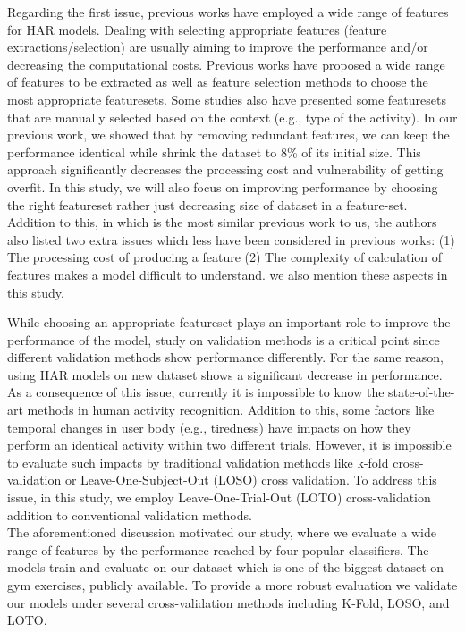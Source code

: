 \documentclass[journal,article,submit,moreauthors,pdftex]{Definitions/mdpi}
\begin{document}
%
Regarding the first issue, previous works have employed a wide range of features for HAR models. Dealing with selecting appropriate features (feature extractions/selection) are usually aiming to improve the performance and/or decreasing the computational costs. Previous works have proposed a wide range of features to be extracted as well as feature selection methods to choose the most appropriate featuresets. Some studies also have presented some featuresets that are manually selected based on the context (e.g., type of the activity). In our previous work\cite{Nourani_CoMoRea2019}, we showed that by removing redundant features, we can keep the performance identical while shrink the dataset to 8\% of its initial size. This approach significantly decreases the processing cost and vulnerability of getting overfit. In this study, we will also focus on improving performance by choosing the right featureset rather just decreasing size of dataset in a feature-set.\\
Addition to this, in \cite{rosati2018comparison} which is the most similar previous work to us, the authors also listed two extra issues which less have been considered in previous works:
(1) The processing cost of producing a feature
(2) The complexity of calculation of features makes a model difficult to understand.
we also mention these aspects in this study.

While choosing an appropriate featureset plays an important role to improve the performance of the model, study on validation methods is a critical point since different validation methods show performance differently. For the same reason, using HAR models on new dataset shows a significant decrease in performance. As a consequence of this issue, currently it is impossible to know the state-of-the-art methods in human activity recognition\cite{jordao2018human}. Addition to this, some factors like temporal changes in user body (e.g., tiredness) have impacts on how they perform an identical activity within two different trials. However, it is impossible to evaluate such impacts by traditional validation methods like k-fold cross-validation or Leave-One-Subject-Out (LOSO) cross validation. To address this issue, in this study, we employ Leave-One-Trial-Out (LOTO) cross-validation addition to conventional validation methods.\\


The aforementioned discussion motivated our study, where we evaluate a wide range of features by the performance reached by four popular classifiers. The models train and evaluate on our dataset which is one of the biggest dataset on gym exercises, publicly available. To provide a more robust evaluation we validate our models under several cross-validation methods including K-Fold, LOSO, and LOTO.
\end{document}
